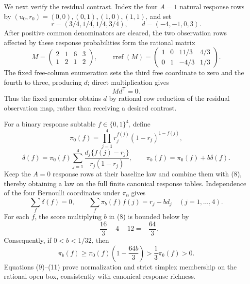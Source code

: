 We next verify the residual contrast.  Index the four \(A=1\) natural response rows by \((u_0,r_0)=(0,0),(0,1),(1,0),(1,1)\), and set
\[
 r=(3/4,1/4,1/4,3/4),
 \qquad d=(-4,-1,0,3).
\tag{4}
\]
After positive common denominators are cleared, the two observation rows affected by these response probabilities form the rational matrix
\[
 M=\begin{pmatrix}2&1&6&3\\1&2&1&2\end{pmatrix},
 \qquad
 \operatorname{rref}(M)=
 \begin{pmatrix}1&0&11/3&4/3\\0&1&-4/3&1/3\end{pmatrix}.
\tag{5}
\]
The fixed free-column enumeration sets the third free coordinate to zero and the fourth to three, producing \(d\); direct multiplication gives
\[
 Md^{\mathsf T}=0.
\tag{6}
\]
Thus the fixed generator obtains \(d\) by rational row reduction of the residual observation map, rather than receiving a desired contrast.

For a binary response subtable \(f\in\{0,1\}^4\), define
\[
 \pi_0(f)=\prod_{j=1}^4r_j^{f(j)}(1-r_j)^{1-f(j)},
\tag{7}
\]
\[
 \delta(f)=\pi_0(f)\sum_{j=1}^4
 \frac{d_j\{f(j)-r_j\}}{r_j(1-r_j)},
 \qquad
 \pi_b(f)=\pi_0(f)+b\delta(f).
\tag{8}
\]
Keep the \(A=0\) response rows at their baseline law and combine them with (8), thereby obtaining a law on the full finite canonical response tables.  Independence of the four Bernoulli coordinates under \(\pi_0\) gives
\[
 \sum_f\delta(f)=0,
 \qquad
 \sum_f\pi_b(f)f(j)=r_j+bd_j
 \quad(j=1,\ldots,4).
\tag{9}
\]
For each \(f\), the score multiplying \(b\) in (8) is bounded below by
\[
 -\frac{16}{3}-4-12=-\frac{64}{3}.
\tag{10}
\]
Consequently, if \(0<b<1/32\), then
\[
 \pi_b(f)\geq \pi_0(f)\left(1-\frac{64b}{3}\right)
 >\frac13\pi_0(f)>0.
\tag{11}
\]
Equations (9)--(11) prove normalization and strict simplex membership on the rational open box, consistently with canonical-response richness.

